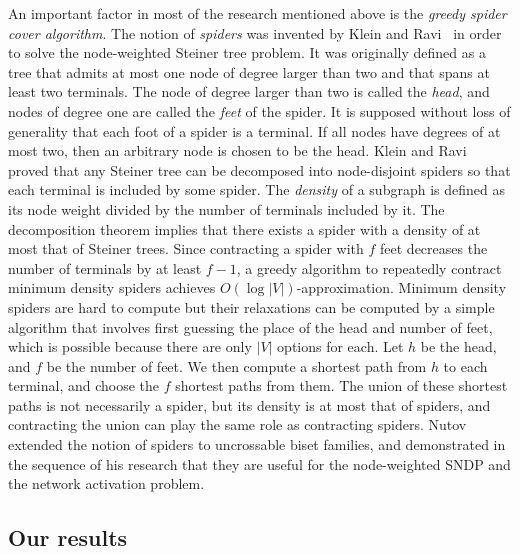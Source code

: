 \documentclass[11pt]{article}
\begin{document}
An important factor
in most of the research mentioned above is the {\em greedy spider cover algorithm}.
The notion of {\em spiders} was invented by Klein and Ravi~\cite{KleinR95} in
order to solve
the node-weighted Steiner tree problem. 
It was originally defined as a tree that admits at most one
node of degree larger than two and that spans at least two terminals.
The node of degree larger than two is called the {\em head}, 
and nodes of degree one are called the {\em feet}
of the spider. 
It is supposed without loss of generality that each foot of a spider is a terminal.
If all nodes have degrees of at most two, then an arbitrary node is chosen to be the head.
Klein and Ravi~\cite{KleinR95} proved that any Steiner tree can be
decomposed into node-disjoint spiders so that each terminal is included by
some spider. The {\em density} of a subgraph is defined as 
its node weight divided by the number of terminals included by it.
The decomposition theorem implies that there exists a spider with a
density of at
most that of Steiner trees. 
Since contracting a spider with $f$ feet decreases the number of
terminals by at least $f-1$,
a greedy algorithm to 
repeatedly contract minimum density spiders
achieves $O(\log |V|)$-approximation.
Minimum density spiders are hard to compute but their relaxations can be
computed by a simple algorithm that involves first guessing the place of the head and 
number of feet, which is possible
because there are only $|V|$ options for each. Let $h$ be the head, and
$f$ be the number of feet.
We then compute a shortest path from $h$ to each terminal, and
choose the $f$ shortest paths from them.
The union of these shortest paths is not necessarily a spider, but its
density is at most that of spiders, and contracting the union can play the
same role as contracting spiders.
Nutov~\cite{Nutov10node-weights,Nutov12uncrossable,Nutov13activation}
extended the notion of spiders to uncrossable biset families, and demonstrated in the
sequence of his research that they are useful for the node-weighted SNDP and the
network activation problem.  


\subsection{Our results}
\end{document}
